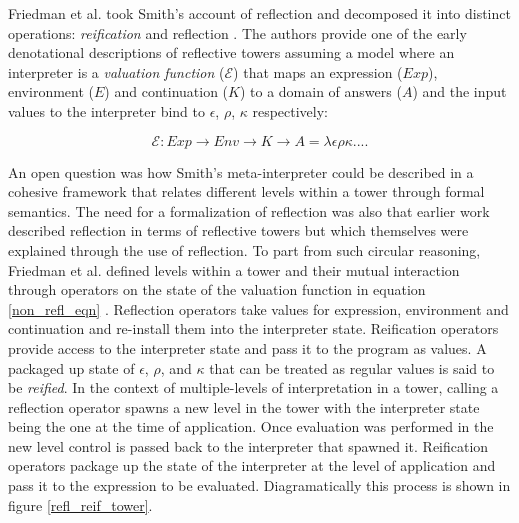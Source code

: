 \documentclass{article}
\theoremstyle{definition}
\begin{document}
Friedman et al. took Smith's account of reflection and decomposed it into distinct operations: \textit{reification} and reflection \cite{friedman1984reification, wand1988mystery}. The authors provide one of the early denotational descriptions of reflective towers assuming a model where an interpreter is a \textit{valuation function} ($\mathcal{E}$) that maps an expression ($Exp$), environment ($E$) and continuation ($K$) to a domain of answers ($A$) and the input values to the interpreter bind to $\epsilon$, $\rho$, $\kappa$ respectively:

\begin{equation}\label{non_refl_eqn}
\mathcal{E}: Exp \rightarrow Env \rightarrow K \rightarrow A = \lambda\epsilon\rho\kappa....
\end{equation}

An open question was how Smith's meta-interpreter \cite{smith1982reflection} could be described in a cohesive framework that relates different levels within a tower through formal semantics. The need for a formalization of reflection was also that earlier work described reflection in terms of reflective towers but which themselves were explained through the use of reflection. To part from such circular reasoning, Friedman et al. defined levels within a tower and their mutual interaction through operators on the state of the valuation function in equation \ref{non_refl_eqn} \cite{friedman1984reification}. Reflection operators take values for expression, environment and continuation and re-install them into the interpreter state. Reification operators provide access to the interpreter state and pass it to the program as values. A packaged up state of $\epsilon$, $\rho$, and $\kappa$ that can be treated as regular values is said to be \textit{reified}. In the context of multiple-levels of interpretation in a tower, calling a reflection operator spawns a new level in the tower with the interpreter state being the one at the time of application. Once evaluation was performed in the new level control is passed back to the interpreter that spawned it. Reification operators package up the state of the interpreter at the level of application and pass it to the expression to be evaluated. Diagramatically this process is shown in figure \ref{refl_reif_tower}.

\end{document}
